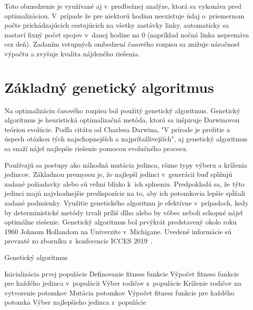 Toto obmedzenie je využívané aj v~predbežnej analýze, ktorá sa vykonáva pred optimalizáciou.
V~prípade že pre niektorú hodinu neexistuje údaj o~priemernom počte prichádzajúcich cestujúcich na všetky zastávky linky, automaticky sa nastaví fixný počet spojov v~danej hodine na 0 (napríklad nočná linka nepremáva cez deň).
Zadaním vstupných ombedzení časového rozpisu sa znižuje náročnosť výpočtu a zvyšuje kvalita nájdeného riešenia.

\section{Základný genetický algoritmus}\label{implementacia_genetickeho_algoritmu}
Na optimalizáciu časového rozpisu bol použitý genetický algoritmus.
Genetický algoritmus je heuristická optimalizačná metóda, ktorá sa inšpiruje Darwinovou teóriou evolúcie.
Podľa citátu od Charlesa Darwina, "V prírode je prežitie a úspech otázkou tých najschopnejších a najpríťažlivejších",
aj genetický algoritmus sa snaží nájsť najlepšie riešenie pomocou evolučného procesu.

Používajú sa postupy ako náhodná mutácia jedinca, rôzne typy výberu a kríženia jedincov.
Základnou premysou je, že najlepší jedinci v~generácii buď splňujú zadané požiadavky alebo sú veľmi blízko k~ich splneniu.
Predpokladá sa, že týto jedinci majú najvhodnejšie predispozície na to, aby ich potomkovia lepšie spĺňali zadané podmienky.
Využitie genetického algoritmu je efektívne v~prípadoch, kedy by deterministické metódy trvali príliš dlho alebo by vôbec neboli schopné nájsť optimálne riešenie.
Genetický algoritmus bol prvýkrát predstavený okolo roku 1960 Johnom Hollandom na Univerzite v~Michigane.
Uvedené informácie sú prevzaté zo zborníku z~konferencie ICCES 2019~\cite{immanuel2019genetic}.

\vspace*{\dimexpr0.5\baselineskip\relax}
\begin{algorithm}[H]\label{algoritmus_geneticky_algoritmus}
\caption{Genetický algoritmus}
  Inicializácia prvej populácie\;
  Definovanie fitness funkcie\;
  Výpočet fitness funkcie pre každého jedinca v~populácii\;
   {
    Výber rodičov z~populácie\;
    Kríženie rodičov na vytvorenie potomkov\;
    Mutácia potomkov\;
    Výpočet fitness funkcie pre každého potomka\;
  }
  Výber najlepšieho jedinca z~populácie\;
\end{algorithm}
\vspace*{\dimexpr0.5\baselineskip\relax}

